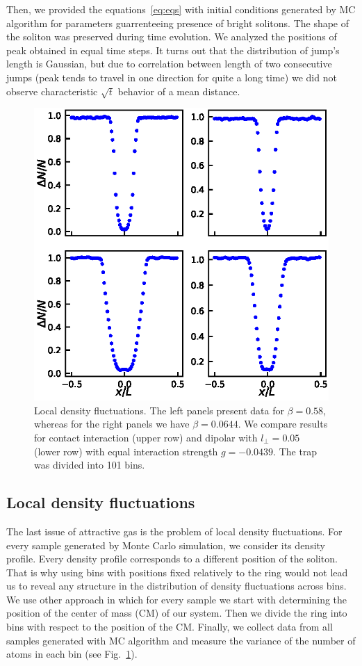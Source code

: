 \documentclass[aps,pra,reprint]{revtex4-2}
\begin{document}
Then, we provided the equations~\eqref{eq:eqs} with initial conditions 
generated by MC algorithm for parameters guarrenteeing presence of bright 
solitons. The shape of the soliton was preserved during time evolution. We 
analyzed the positions of peak obtained in equal time steps. It turns out that 
the distribution of jump's length is Gaussian, but due to correlation between 
length of two consecutive jumps (peak tends to travel in one direction for 
quite a long time) we did not observe characteristic $\sqrt{t}$ behavior 
of a mean distance.
\begin{figure}[h]
\includegraphics{fig6.eps}
\caption{Local density fluctuations. The left panels present data for 
$\beta=0.58$, whereas for the right panels we have $\beta=0.0644$. We compare 
results for contact interaction (upper row) and dipolar with $l_{\perp}=0.05$ 
(lower row) with equal interaction strength $g=-0.0439$. The trap was divided 
into 101 bins.}
\label{fig:localfluc}
\end{figure}

\subsection{Local density fluctuations}
The last issue of attractive gas is the problem of local density fluctuations. 
For every sample generated by Monte Carlo simulation, we consider its density 
profile. Every density profile corresponds to a different position of the 
soliton. That is why using bins with positions fixed relatively to the ring 
would not lead us to reveal any structure in the distribution of density 
fluctuations across bins. We use other approach in which for every sample we 
start with determining the position of the center of mass (CM) of our system. 
Then we divide the ring into bins with respect to the position of the CM. 
Finally, we collect data from all samples generated with MC algorithm and 
measure the variance of the number of atoms in each bin 
(see Fig.~\ref{fig:localfluc}).
\end{document}
